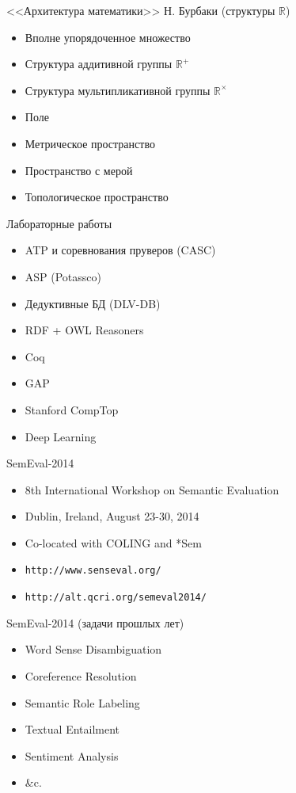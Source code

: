\documentclass{beamer}
\begin{document}
\begin{frame}{<<Архитектура математики>> Н. Бурбаки (структуры $\mathbb{R}$)}
    \begin{itemize}
        \item Вполне упорядоченное множество
        \item Структура аддитивной группы $\mathbb{R}^+$
        \item Структура мультипликативной группы $\mathbb{R}^\times$
        \item Поле 
        \item Метрическое пространство
        \item Пространство с мерой
        \item Топологическое пространство
    \end{itemize}
\end{frame}


\begin{frame}{Лабораторные работы}
    \begin{itemize}
        \item ATP и соревнования пруверов (CASC)
        \item ASP (Potassco)
        \item Дедуктивные БД (DLV-DB)
        \item RDF + OWL Reasoners
        \item Coq
        \item GAP
        \item Stanford CompTop
        \item Deep Learning
    \end{itemize}
\end{frame}

\begin{frame}{SemEval-2014}
    \begin{itemize}
        \item 8th International Workshop on Semantic Evaluation
        \item Dublin, Ireland, August 23-30, 2014
        \item Co-located with COLING and *Sem
        \item \texttt{http://www.senseval.org/}
        \item \texttt{http://alt.qcri.org/semeval2014/}
    \end{itemize}
\end{frame}

\begin{frame}{SemEval-2014 (задачи прошлых лет)}
    \begin{itemize}
        \item Word Sense Disambiguation
        \item Coreference Resolution
        \item Semantic Role Labeling
        \item Textual Entailment
        \item Sentiment Analysis
        \item \&c.
    \end{itemize}
\end{frame}
\end{document}
